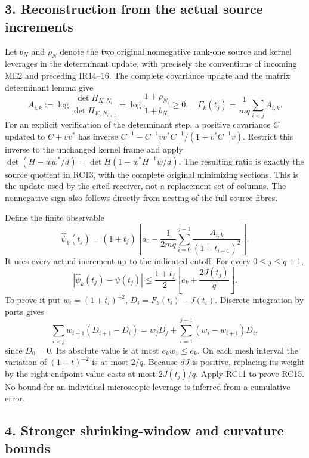 \documentclass[10pt]{article}
\begin{document}
\subsection{3. Reconstruction from the actual source increments}\label{reconstruction-from-the-actual-source-increments}

Let \(b_N\) and \(\rho_N\) denote the two original nonnegative rank-one source and kernel leverages in the determinant update, with precisely the conventions of incoming ME2 and preceding IR14--16. The complete covariance update and the matrix determinant lemma give \[
A_{i,k}:=\log\frac{\det H_{K,N_i}}{\det H_{K,N_{i+1}}}
=\log\frac{1+\rho_{N_i}}{1+b_{N_i}}\ge0,
\quad F_k(t_j)=\frac1{mq}\sum_{i<j}A_{i,k}.
\tag{RC13}
\] For an explicit verification of the determinant step, a positive covariance \(C\) updated to \(C+vv^*\) has inverse \(C^{-1}-C^{-1}vv^*C^{-1}/(1+v^*C^{-1}v)\). Restrict this inverse to the unchanged kernel frame and apply \(\det(H-ww^*/d)=\det H(1-w^*H^{-1}w/d)\). The resulting ratio is exactly the source quotient in RC13, with the complete original minimizing sections. This is the update used by the cited receiver, not a replacement set of columns. The nonnegative sign also follows directly from nesting of the full source fibres.

Define the finite observable \[
\widehat\psi_k(t_j)=(1+t_j)\left[a_0-
\frac1{2mq}\sum_{i=0}^{j-1}\frac{A_{i,k}}{(1+t_{i+1})^2}\right].
\tag{RC14}
\] It uses every actual increment up to the indicated cutoff. For every \(0\le j\le q+1\), \[
\boxed{|\widehat\psi_k(t_j)-\psi(t_j)|
\le\frac{1+t_j}{2}\left[e_k+\frac{2J(t_j)}q\right].}
\tag{RC15}
\] To prove it put \(w_i=(1+t_i)^{-2}\), \(D_i=F_k(t_i)-J(t_i)\). Discrete integration by parts gives \[
\sum_{i<j}w_{i+1}(D_{i+1}-D_i)
=w_jD_j+\sum_{i=1}^{j-1}(w_i-w_{i+1})D_i,
\] since \(D_0=0\). Its absolute value is at most \(e_kw_1\le e_k\). On each mesh interval the variation of \((1+t)^{-2}\) is at most \(2/q\). Because \(dJ\) is positive, replacing its weight by the right-endpoint value costs at most \(2J(t_j)/q\). Apply RC11 to prove RC15. No bound for an individual microscopic leverage is inferred from a cumulative error.

\subsection{4. Stronger shrinking-window and curvature bounds}\label{stronger-shrinking-window-and-curvature-bounds}
\end{document}
